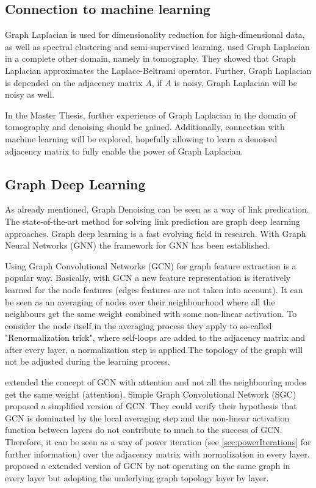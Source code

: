 \subsection{Connection to machine learning}

Graph Laplacian is used for dimensionality reduction for high-dimensional data, as well as spectral clustering and semi-supervised learning.
\citet{LaplaceRandomProjections} used Graph Laplacian in a complete other domain, namely in tomography. 
They showed that Graph Laplacian approximates the Laplace-Beltrami operator.
Further, Graph Laplacian is depended on the adjacency matrix $A$, if $A$ is noisy, Graph Laplacian will be noisy as well.


\begin{tcolorbox}[colback=red!5!white,colframe=red!75!black]
    In the Master Thesis, further experience of Graph Laplacian in the domain of tomography and denoising
    should be gained. Additionally, connection with machine learning will be explored, hopefully allowing to learn a denoised 
    adjacency matrix to fully enable the power of Graph Laplacian.
\end{tcolorbox}


\subsection{Graph Deep Learning}
As already mentioned, Graph Denoising can be seen as a way of link predication. 
The state-of-the-art method for solving link prediction are graph deep learning approaches.
Graph deep learning is a fast evolving field in research. With Graph Neural Networks (GNN)\cite{GNN} the framework
for GNN has been established. 

Using Graph Convolutional Networks (GCN) \cite{GCN} for graph feature extraction is a popular way. 
Basically, with GCN a new feature representation is iteratively learned for the node features (edges features are not taken into account).
It can be seen as an averaging of nodes over their neighbourhood where all the neighbours get the same weight combined with some non-linear activation. 
To consider the node itself in the averaging process they apply to so-called "Renormalization trick", where self-loops are added to the 
adjacency matrix and after every layer, a normalization step is applied.The topology of the graph will not be adjusted during the learning process.

\citet{GAT} extended the concept of GCN with attention and not all the neighbouring nodes get the same weight (attention).
Simple Graph Convolutional Network (SGC) \cite{simpleGCN} proposed a simplified version of GCN.
They could verify their hypothesis that GCN is dominated by the local averaging step and the non-linear 
activation function between layers do not contribute to much to the success of GCN. 
Therefore, it can be seen as a way of power iteration (see \ref{sec:powerIterations} for further information) over the adjacency matrix with normalization in every layer.
\citet{dynamicGCN} proposed a extended version of GCN by not operating on the same graph in every layer but adopting
the underlying graph topology layer by layer.

